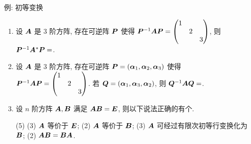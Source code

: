 \begin{frame}{例: 初等变换}
	\onslide<+->
	\begin{exercise}
		\begin{enumerate}
			\item 设 $\bfA$ 是 $3$ 阶方阵, 存在可逆阵 $\bfP$ 使得 $\bfP^{-1}\bfA\bfP=\begin{pmatrix}
				1&&\\&2&\\&&3
			\end{pmatrix}$, 则 $\bfP^{-1}\bfA^*\bfP=$.
			\item 设 $\bfA$ 是 $3$ 阶方阵, 存在可逆阵 $\bfP=(\bma_1,\bma_2,\bma_3)$ 使得 $\bfP^{-1}\bfA\bfP=\begin{pmatrix}
				1&&\\&2&\\&&3
			\end{pmatrix}$.
			若 $\bfQ=(\bma_1,\bma_3,\bma_2)$, 则 $\bfQ^{-1}\bfA\bfQ=$.
			\item 设 $n$ 阶方阵 $\bfA,\bfB$ 满足 $\bfA\bfB=\bfE$, 则以下说法正确的有个.
			\begin{tasks}[label={(\Roman*)},label-format=\upshape](5)
				\task*(3) $\bfA$ 等价于 $\bfE$;
				\task*(2) $\bfA$ 等价于 $\bfB$;
				\task*(3) $\bfA$ 可经过有限次初等行变换化为 $\bfB$;
				\task*(2) $\bfA\bfB=\bfB\bfA$.
			\end{tasks}
		\end{enumerate}
	\end{exercise}
\end{frame}
